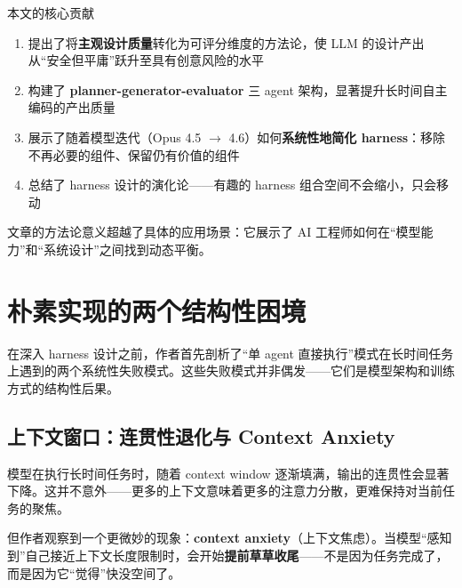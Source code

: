 \documentclass[a4paper]{article}
\begin{document}
\begin{importantbox}{本文的核心贡献}
\begin{enumerate}[leftmargin=1.5em]
    \item 提出了将\textbf{主观设计质量}转化为可评分维度的方法论，使 LLM 的设计产出从``安全但平庸''跃升至具有创意风险的水平
    \item 构建了 \textbf{planner-generator-evaluator} 三 agent 架构，显著提升长时间自主编码的产出质量
    \item 展示了随着模型迭代（Opus 4.5 $\to$ 4.6）如何\textbf{系统性地简化 harness}：移除不再必要的组件、保留仍有价值的组件
    \item 总结了 harness 设计的演化论——有趣的 harness 组合空间不会缩小，只会移动
\end{enumerate}
\end{importantbox}

文章的方法论意义超越了具体的应用场景：它展示了 AI 工程师如何在``模型能力''和``系统设计''之间找到动态平衡。


\section{朴素实现的两个结构性困境}

在深入 harness 设计之前，作者首先剖析了``单 agent 直接执行''模式在长时间任务上遇到的两个系统性失败模式。这些失败模式并非偶发——它们是模型架构和训练方式的结构性后果。

\subsection{上下文窗口：连贯性退化与 Context Anxiety}

模型在执行长时间任务时，随着 context window 逐渐填满，输出的连贯性会显著下降。这并不意外——更多的上下文意味着更多的注意力分散，更难保持对当前任务的聚焦。

但作者观察到一个更微妙的现象：\textbf{context anxiety}（上下文焦虑）。当模型``感知到''自己接近上下文长度限制时，会开始\textbf{提前草草收尾}——不是因为任务完成了，而是因为它``觉得''快没空间了。
\end{document}
